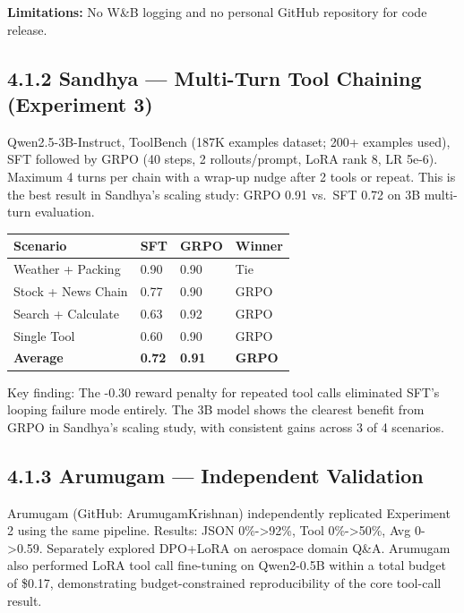 \documentclass[
  american,
  11pt,
  a4paper,
  oneside]{report}
\newcounter{none} %
\begin{document}
\textbf{Limitations:} No W\&B logging and no personal GitHub repository
for code release.

\subsection{4.1.2 Sandhya --- Multi-Turn Tool Chaining (Experiment
3)}\label{sandhya-multi-turn-tool-chaining-experiment-3}

Qwen2.5-3B-Instruct, ToolBench (187K examples dataset; 200+ examples
used), SFT followed by GRPO (40 steps, 2 rollouts/prompt, LoRA rank 8,
LR 5e-6). Maximum 4 turns per chain with a wrap-up nudge after 2 tools
or repeat. This is the best result in Sandhya's scaling study: GRPO 0.91
vs.~SFT 0.72 on 3B multi-turn evaluation.

{\def\LTcaptype{none} %
\begin{longtable}[]{@{}llll@{}}
\toprule\noalign{}
Scenario & SFT & GRPO & Winner \\
\midrule\noalign{}
\endhead
\bottomrule\noalign{}
\endlastfoot
Weather + Packing & 0.90 & 0.90 & Tie \\
Stock + News Chain & 0.77 & 0.90 & GRPO \\
Search + Calculate & 0.63 & 0.92 & GRPO \\
Single Tool & 0.60 & 0.90 & GRPO \\
\textbf{Average} & \textbf{0.72} & \textbf{0.91} & \textbf{GRPO} \\
\end{longtable}
}

Key finding: The -0.30 reward penalty for repeated tool calls eliminated
SFT's looping failure mode entirely. The 3B model shows the clearest
benefit from GRPO in Sandhya's scaling study, with consistent gains
across 3 of 4 scenarios.

\subsection{4.1.3 Arumugam --- Independent
Validation}\label{arumugam-independent-validation}

Arumugam (GitHub: ArumugamKrishnan) independently replicated Experiment
2 using the same pipeline. Results: JSON 0\%-\textgreater92\%, Tool
0\%-\textgreater50\%, Avg 0-\textgreater0.59. Separately explored
DPO+LoRA on aerospace domain Q\&A. Arumugam also performed LoRA tool
call fine-tuning on Qwen2-0.5B within a total budget of \$0.17,
demonstrating budget-constrained reproducibility of the core tool-call
result.
\end{document}
